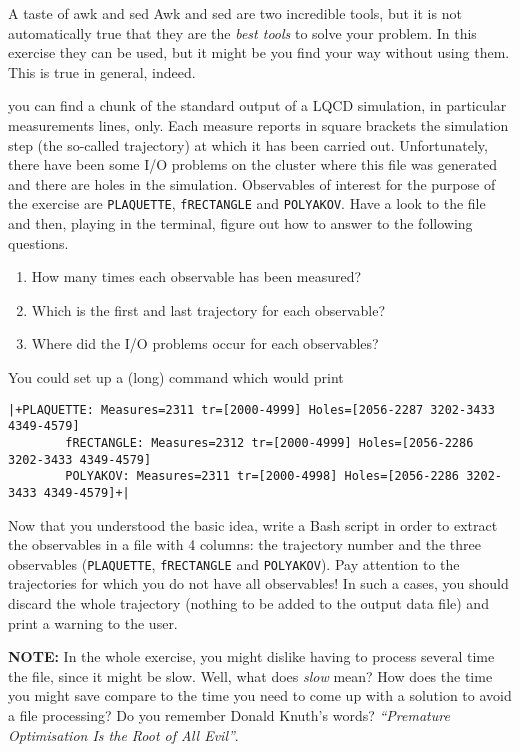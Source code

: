 \begin{exercise}[Inspirational]{A taste of awk and sed}
    Awk and sed are two incredible tools, but it is not automatically true that they are the \emph{best tools} to solve your problem.
    In this exercise they can be used, but it might be you find your way without using them.
    This is true in general, indeed.

     you can find a chunk of the standard output of a LQCD simulation, in particular measurements lines, only.
    Each measure reports in square brackets the simulation step (the so-called trajectory) at which it has been carried out.
    Unfortunately, there have been some I/O problems on the cluster where this file was generated and there are holes in the simulation.
    Observables of interest for the purpose of the exercise are \texttt{PLAQUETTE}, \texttt{fRECTANGLE} and \texttt{POLYAKOV}.
    Have a look to the file and then, playing in the terminal, figure out how to answer to the following questions.
    \begin{enumerate}
        \item How many times each observable has been measured?
        \item Which is the first and last trajectory for each observable?
        \item Where did the I/O problems occur for each observables?
    \end{enumerate}
    You could set up a (long) command which would print
    \begin{lstlisting}[style=MyBash, xleftmargin=3mm, xrightmargin=1mm]
        |+PLAQUETTE: Measures=2311 tr=[2000-4999] Holes=[2056-2287 3202-3433 4349-4579]
        fRECTANGLE: Measures=2312 tr=[2000-4999] Holes=[2056-2286 3202-3433 4349-4579]
        POLYAKOV: Measures=2311 tr=[2000-4998] Holes=[2056-2286 3202-3433 4349-4579]+|
    \end{lstlisting}

    Now that you understood the basic idea, write a Bash script in order to extract the observables in a file with 4 columns: the trajectory number and the three observables (\texttt{PLAQUETTE}, \texttt{fRECTANGLE} and \texttt{POLYAKOV}).
    Pay attention to the trajectories for which you do not have all observables!
    In such a cases, you should discard the whole trajectory (nothing to be added to the output data file) and print a warning to the user.
    
    \textbf{NOTE:} In the whole exercise, you might dislike having to process several time the file, since it might be slow.
    Well, what does \emph{slow} mean?
    How does the time you might save compare to the time you need to come up with a solution to avoid a file processing?
    Do you remember Donald Knuth's words? \emph{``Premature Optimisation Is the Root of All Evil''}.
\end{exercise}